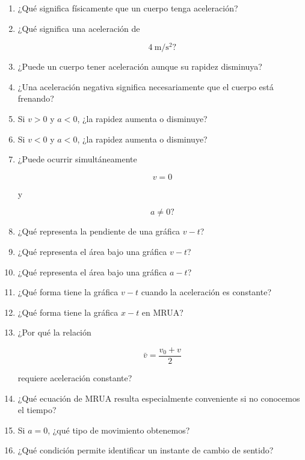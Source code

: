 \begin{enumerate}

    \item ¿Qué significa físicamente que un cuerpo tenga aceleración?

    \item ¿Qué significa una aceleración de

    \[
    \SI{4}{\meter\per\second\squared}?
    \]

    \item ¿Puede un cuerpo tener aceleración aunque su rapidez disminuya?

    \item ¿Una aceleración negativa significa necesariamente que el cuerpo
    está frenando?

    \item Si \(v>0\) y \(a<0\), ¿la rapidez aumenta o disminuye?

    \item Si \(v<0\) y \(a<0\), ¿la rapidez aumenta o disminuye?

    \item ¿Puede ocurrir simultáneamente

    \[
    v=0
    \]

    y

    \[
    a\neq0?
    \]

    \item ¿Qué representa la pendiente de una gráfica \(v-t\)?

    \item ¿Qué representa el área bajo una gráfica \(v-t\)?

    \item ¿Qué representa el área bajo una gráfica \(a-t\)?

    \item ¿Qué forma tiene la gráfica \(v-t\) cuando la aceleración es
    constante?

    \item ¿Qué forma tiene la gráfica \(x-t\) en MRUA?

    \item ¿Por qué la relación

    \[
    \bar{v}=\frac{v_0+v}{2}
    \]

    requiere aceleración constante?

    \item ¿Qué ecuación de MRUA resulta especialmente conveniente si no
    conocemos el tiempo?

    \item Si \(a=0\), ¿qué tipo de movimiento obtenemos?

    \item ¿Qué condición permite identificar un instante de cambio de
    sentido?

\end{enumerate}



